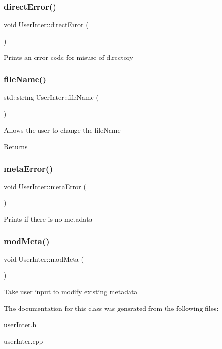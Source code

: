 \subsubsection{\texorpdfstring{direct\+Error()}{directError()}}
{\footnotesize\ttfamily void User\+Inter\+::direct\+Error (\begin{DoxyParamCaption}{ }\end{DoxyParamCaption})\hspace{0.3cm}{\ttfamily [static]}}

Prints an error code for misuse of directory \mbox{\label{classUserInter_a756f309337489c85e3331077fad3cc0b}} 
\subsubsection{\texorpdfstring{file\+Name()}{fileName()}}
{\footnotesize\ttfamily std\+::string User\+Inter\+::file\+Name (\begin{DoxyParamCaption}{ }\end{DoxyParamCaption})\hspace{0.3cm}{\ttfamily [static]}}

Allows the user to change the file\+Name \begin{DoxyReturn}{Returns}

\end{DoxyReturn}
\mbox{\label{classUserInter_a1a0d0dbcb309e71c900e7a7fcc933099}} 
\subsubsection{\texorpdfstring{meta\+Error()}{metaError()}}
{\footnotesize\ttfamily void User\+Inter\+::meta\+Error (\begin{DoxyParamCaption}{ }\end{DoxyParamCaption})\hspace{0.3cm}{\ttfamily [static]}}

Prints if there is no metadata \mbox{\label{classUserInter_ac64d3bb2f75081f223be74880149d9ea}} 
\subsubsection{\texorpdfstring{mod\+Meta()}{modMeta()}}
{\footnotesize\ttfamily void User\+Inter\+::mod\+Meta (\begin{DoxyParamCaption}{ }\end{DoxyParamCaption})\hspace{0.3cm}{\ttfamily [static]}}

Take user input to modify existing metadata 

The documentation for this class was generated from the following files\+:\begin{DoxyCompactItemize}
\item 
user\+Inter.\+h\item 
user\+Inter.\+cpp\end{DoxyCompactItemize}
